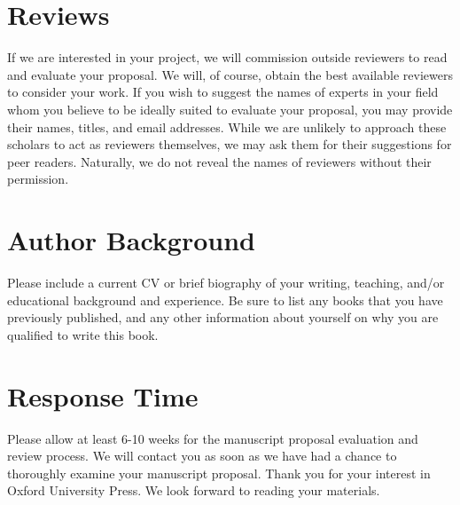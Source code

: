 \documentclass[10pt,dvipsnames,enabledeprecatedfontcommands]{scrartcl}
\begin{document}
\hypertarget{reviews}{%
\section{Reviews}\label{reviews}}

If we are interested in your project, we will commission outside
reviewers to read and evaluate your proposal. We will, of course, obtain
the best available reviewers to consider your work. If you wish to
suggest the names of experts in your field whom you believe to be
ideally suited to evaluate your proposal, you may provide their names,
titles, and email addresses. While we are unlikely to approach these
scholars to act as reviewers themselves, we may ask them for their
suggestions for peer readers. Naturally, we do not reveal the names of
reviewers without their permission.

\hypertarget{author-background}{%
\section{Author Background}\label{author-background}}

Please include a current CV or brief biography of your writing,
teaching, and/or educational background and experience. Be sure to list
any books that you have previously published, and any other information
about yourself on why you are qualified to write this book.

\hypertarget{response-time}{%
\section{Response Time}\label{response-time}}

Please allow at least 6-10 weeks for the manuscript proposal evaluation
and review process. We will contact you as soon as we have had a chance
to thoroughly examine your manuscript proposal. Thank you for your
interest in Oxford University Press. We look forward to reading your
materials.
\end{document}
